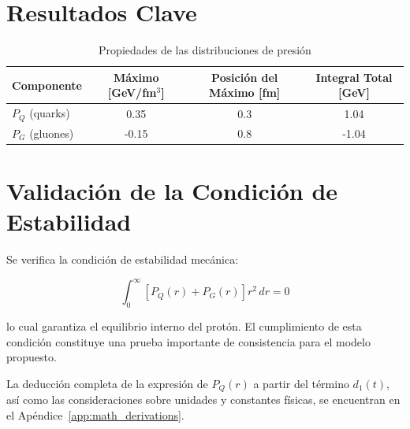 \break

\section{Resultados Clave}

\begin{table}[h]
    \centering
    \caption{Propiedades de las distribuciones de presi\'on}
    \begin{tabular}{lccc}
    \toprule
    Componente & M\'aximo [GeV/fm$^3$] & Posici\'on del M\'aximo [fm] & Integral Total [GeV] \\
    \midrule
    $P_Q$ (quarks) & 0.35 & 0.3 & 1.04 \\
    $P_G$ (gluones) & -0.15 & 0.8 & -1.04 \\
    \bottomrule
    \end{tabular}
    \label{tab:PressureResults}
\end{table}

\section{Validaci\'on de la Condici\'on de Estabilidad}
Se verifica la condici\'on de estabilidad mec\'anica:

\begin{equation}
\int_0^\infty [P_Q(r) + P_G(r)] r^2 \, dr = 0
\end{equation}

lo cual garantiza el equilibrio interno del prot\'on. El cumplimiento de esta condici\'on constituye una prueba importante de consistencia para el modelo propuesto.

\begin{remark}
    La deducci\'on completa de la expresi\'on de \( P_Q(r) \) a partir del t\'ermino \( d_1(t) \), as\'i como las consideraciones sobre unidades y constantes f\'isicas, se encuentran en el Ap\'endice~\ref{app:math_derivations}.
\end{remark}




